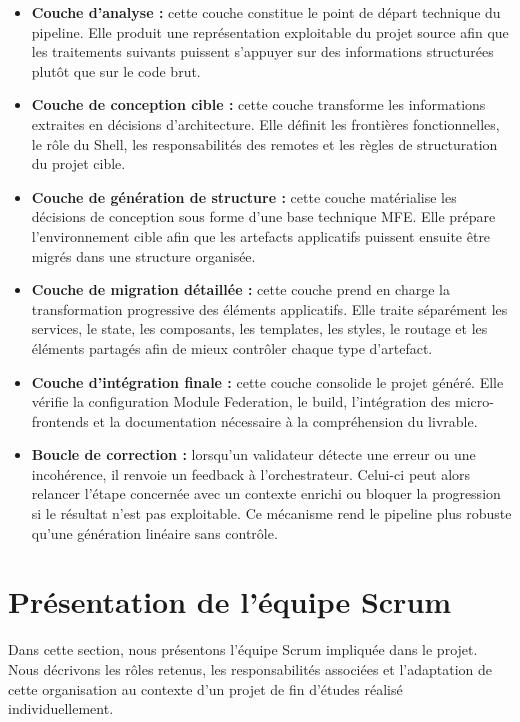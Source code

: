 \begin{itemize}
    \item \textbf{Couche d'analyse :} cette couche constitue le point de départ technique du pipeline. Elle produit une représentation exploitable du projet source afin que les traitements suivants puissent s'appuyer sur des informations structurées plutôt que sur le code brut.

    \item \textbf{Couche de conception cible :} cette couche transforme les informations extraites en décisions d'architecture. Elle définit les frontières fonctionnelles, le rôle du Shell, les responsabilités des remotes et les règles de structuration du projet cible.

    \item \textbf{Couche de génération de structure :} cette couche matérialise les décisions de conception sous forme d'une base technique MFE. Elle prépare l'environnement cible afin que les artefacts applicatifs puissent ensuite être migrés dans une structure organisée.

    \item \textbf{Couche de migration détaillée :} cette couche prend en charge la transformation progressive des éléments applicatifs. Elle traite séparément les services, le state, les composants, les templates, les styles, le routage et les éléments partagés afin de mieux contrôler chaque type d'artefact.

    \item \textbf{Couche d'intégration finale :} cette couche consolide le projet généré. Elle vérifie la configuration Module Federation, le build, l'intégration des micro-frontends et la documentation nécessaire à la compréhension du livrable.

    \item \textbf{Boucle de correction :} lorsqu'un validateur détecte une erreur ou une incohérence, il renvoie un feedback à l'orchestrateur. Celui-ci peut alors relancer l'étape concernée avec un contexte enrichi ou bloquer la progression si le résultat n'est pas exploitable. Ce mécanisme rend le pipeline plus robuste qu'une génération linéaire sans contrôle.
\end{itemize}

\section{Présentation de l'équipe Scrum}

Dans cette section, nous présentons l'équipe Scrum impliquée dans le projet. Nous décrivons les rôles retenus, les responsabilités associées et l'adaptation de cette organisation au contexte d'un projet de fin d'études réalisé individuellement.

